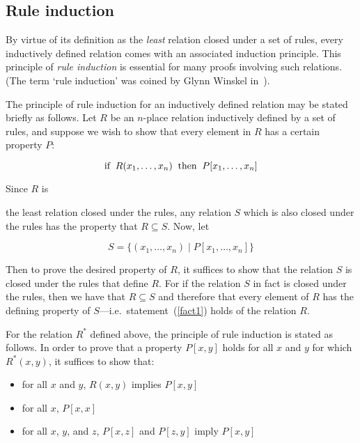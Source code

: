 \subsection{Rule induction}\label{rule-ind}

By virtue of its definition as the {\it least\/} relation closed under a set of
rules, every inductively defined relation comes with an associated induction
principle.  This principle of {\it rule induction\/} is essential for many
proofs involving such relations. (The term `rule induction' was coined by Glynn
Winskel in~\cite{winskel}). 

The principle of rule induction for an inductively defined relation may be
stated briefly as follows. Let $R$ be an $n$-place relation inductively defined
by a set of rules, and suppose we wish to show that every element in $R$ has a
certain property $P$:

{\samepage 
\begin{equation}\label{fact1}
\hbox{\rm
if}\;\;R(x_1,\dots,x_n)\;\;\hbox{then}\;\;P[x_1,\dots,x_n] 
\end{equation}

\noindent Since $R$ is} \pagebreak[3] the least relation closed under the
rules, any relation $S$ which is also closed under the rules has the property
that $R \subseteq S$.  Now, let

\[S = \{(x_1,\dots,x_n) \mid P[x_1,\dots,x_n]\}\]

\noindent Then to prove the desired property of $R$, it suffices to show that
the relation $S$ is closed under the rules that define $R$. For if the relation
$S$ in fact is closed under the rules, then we have that $R \subseteq S$ and
therefore that every element of $R$ has the defining property of $S$---i.e.\
statement~(\ref{fact1}) holds of the relation $R$.

For the relation $R^{*}$ defined above, the principle of rule induction is
stated as follows. In order to prove that a property $P[x,y]$ holds for all
$x$ and $y$ for which $R^{*}(x,y)$, it suffices to show that:

\begin{itemize}

\item for all $x$ and $y$, $R(x,y)$ implies $P[x,y]$

\item for all $x$, $P[x,x]$ 

\item for all $x$, $y$, and $z$, $P[x,z]$ and $P[z,y]$ imply $P[x,y]$

\end{itemize}


